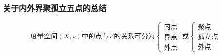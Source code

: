 \subsubsection{关于内外界聚孤立五点的总结}
\begin{equation*}
	\text{度量空间}(X,\rho)\text{中的点与$E$的关系可分为}
	\begin{cases}
		\text{内点} \\
		\text{界点} \\
		\text{外点}    
	\end{cases}\;\text{或}
	\begin{cases}
		\text{聚点}   \\
		\text{孤立点} \\
		\text{外点}    
	\end{cases}
\end{equation*}
